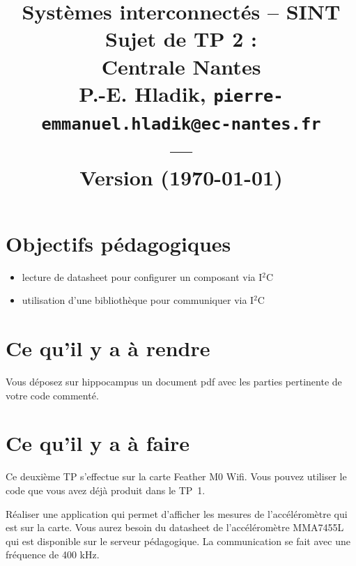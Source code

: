 \documentclass[11pt]{paper}
\title{{\Large Systèmes interconnectés -- SINT }\\
\vspace{-0.4em}
{\large Sujet de TP 2 : \iic}\\
{\small Centrale Nantes}\\
\small P.-E. Hladik, \small{\texttt{pierre-emmanuel.hladik@ec-nantes.fr}}\\
---\\
{\scriptsize  Version \version (\today)}\\
}
\newcommand{\iic}{I$^2$C\xspace}
\begin{document}
\maketitle


  \section{Objectifs pédagogiques}


\begin{itemize}
	\item lecture de datasheet pour configurer un composant via \iic
	\item utilisation d'une bibliothèque pour communiquer via \iic
\end{itemize}

  \section{Ce qu'il y a à rendre}

Vous déposez sur hippocampus un document pdf avec les parties pertinente de votre code commenté.

  \section{Ce qu'il y a à faire}

Ce deuxième TP s’effectue sur la carte Feather M0 Wifi. Vous pouvez utiliser le code que vous avez déjà produit dans le TP~1.

Réaliser une application qui permet d'afficher les mesures de l'accéléromètre qui est sur la carte. Vous aurez besoin du datasheet de l'accéléromètre MMA7455L qui est disponible sur le serveur pédagogique. La communication se fait avec une fréquence de 400 kHz.
\end{document}
